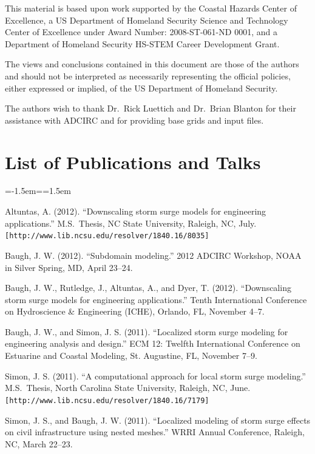 \documentclass[11pt,titlepage]{article}
\newenvironment{outdent}%
{\begin{list}{}%
{\listparindent=-1.5em\itemindent=\listparindent\leftmargin=1.5em}%
\item[]}%
{\end{list}}
\begin{document}
This material is based upon work supported by the Coastal Hazards
Center of Excellence, a US Department of Homeland Security Science and
Technology Center of Excellence under Award Number: 2008-ST-061-ND
0001, and a Department of Homeland Security HS-STEM Career Development
Grant.

The views and conclusions contained in this document are those of the
authors and should not be interpreted as necessarily representing the
official policies, either expressed or implied, of the US Department
of Homeland Security.

The authors wish to thank Dr.~Rick Luettich and Dr.~Brian Blanton for
their assistance with ADCIRC and for providing base grids and input
files.

\section{List of Publications and Talks}

\begin{outdent}
Altuntas, A. (2012). ``Downscaling storm surge models for engineering
applications.'' M.S.~Thesis, NC State University, Raleigh, NC, July.\\
{\small \verb![http://www.lib.ncsu.edu/resolver/1840.16/8035]!}

Baugh, J. W. (2012). ``Subdomain modeling.'' 2012 ADCIRC Workshop,
NOAA in Silver Spring, MD, April 23--24.

Baugh, J. W., Rutledge, J., Altuntas, A., and Dyer, T. (2012).
``Downscaling storm surge models for engineering applications.'' Tenth
International Conference on Hydroscience \& Engineering (ICHE),
Orlando, FL, November 4--7.

Baugh, J. W., and Simon, J. S. (2011). ``Localized storm surge
modeling for engineering analysis and design.'' ECM 12: Twelfth
International Conference on Estuarine and Coastal Modeling,
St. Augustine, FL, November 7--9.

Simon, J. S. (2011). ``A computational approach for local storm
surge modeling.''  M.S.~Thesis, North Carolina State University,
Raleigh, NC, June.\\
{\small \verb![http://www.lib.ncsu.edu/resolver/1840.16/7179]!}

Simon, J. S., and Baugh, J. W. (2011). ``Localized modeling of storm
surge effects on civil infrastructure using nested meshes.'' WRRI
Annual Conference, Raleigh, NC, March 22--23.
\end{outdent}
\end{document}

